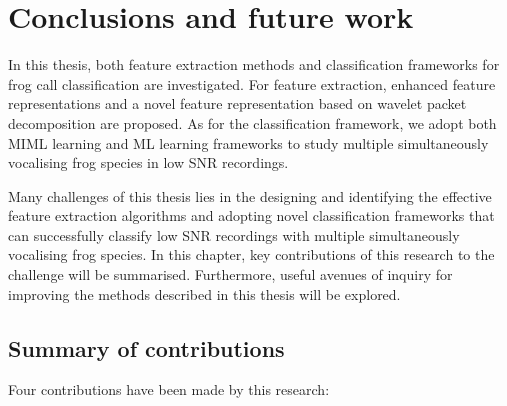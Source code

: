 
\chapter[Conclusions and future work]{Conclusions and future work}
\label{cha:cha8Conclusions}

In this thesis, both feature extraction methods and classification frameworks for frog call classification are investigated. For feature extraction, enhanced feature representations and a novel feature representation based on wavelet packet decomposition are proposed. As for the classification framework, we adopt both MIML learning and ML learning frameworks to study multiple simultaneously vocalising frog species in low SNR recordings. 

Many challenges of this thesis lies in the designing and identifying the effective feature extraction algorithms and adopting novel classification frameworks that can successfully classify low SNR recordings with multiple simultaneously vocalising frog species. 
In this chapter, key contributions of this research to the challenge will be summarised. Furthermore, useful avenues of inquiry for improving the methods described in this thesis will be explored.

\section{Summary of contributions}
	
Four contributions have	been made by this research:


